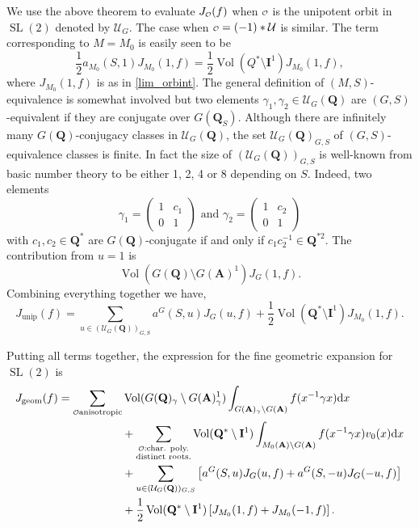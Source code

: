 \documentclass[11pt]{amsart}
\def\A{\mathbf A}
\def\I{\mathbf I}
\def\Q{\mathbf Q}
\def\o{\scalebox{0.8}{$\scriptstyle\mathcal{O}$}}
\def\UUU{\mathcal U}
\def\d{\text d}
\def\bs{\setminus}
\def\sl{\operatorname{SL}}
\def\vol{\operatorname{Vol}}
\theoremstyle{remark}
\begin{document}
We use the above theorem to evaluate $J_{\o}(f)$ when $\o$ is the unipotent orbit in $\sl(2)$ denoted by $\UUU_G$. The case when $\o = (-1)*\UUU$ is similar. The term corresponding to $M=M_0$ is easily seen to be 
\[ \frac{1}{2} a_{M_0}(S, 1) J_{M_0}(1, f) = \frac{1}{2} \vol(Q^*\bs \I^1) J_{M_0}(1, f), \]
where $J_{M_0}(1, f)$ is as in \cref{lim_orbint}. The general definition of $(M, S)$-equivalence is somewhat involved but two elements $\gamma_1, \gamma_2 \in \UUU_G(\Q)$ are $(G, S)$-equivalent if they are conjugate over $G(\Q_S)$. Although there are infinitely many $G(\Q)$-conjugacy classes in $\UUU_G(\Q)$, the set $\UUU_G(\Q)_{G, S}$ of $(G, S)$-equivalence classes is finite. In fact the size of $(\UUU_G(\Q))_{G, S}$ is well-known from basic number theory to be either 1, 2, 4 or 8 depending on $S$. Indeed, two elements
\[ \gamma_1 = \begin{pmatrix} 1 & c_1 \\ 0 & 1 \end{pmatrix} \text{ and } \gamma_2 = \begin{pmatrix} 1 & c_2 \\ 0 & 1 \end{pmatrix}
\]
with $c_1, c_2 \in \Q^*$ are $G(\Q)$-conjugate if and only if $c_1 c_2^{-1} \in \Q^{*2}$. The contribution from $u=1$ is 
\[ \vol(G(\Q)\bs G(\A)^1) J_G(1, f). \]
Combining everything together we have, 
\[ J_{\text{unip}}(f) = \sum_{u \in (\UUU_G(\Q))_{G, S}} a^G(S, u) J_G(u, f) + \frac{1}{2} \vol(\Q^*\bs \I^1) J_{M_0}(1, f). \]

Putting all terms together, the expression for the fine geometric expansion for $\sl(2)$ is
\begin{equation} \label{eq:fine_geom}
	\begin{aligned}
		J_{\text{geom}}(f) = \sum_{\o \text{anisotropic}} & \vol(G(\Q)_\gamma \bs G(\A)^1_\gamma) 
					\int_{G(\A)_\gamma \bs G(\A)} f(x^{-1} \gamma x) \d x \\
			& + \sum_{\substack{\o : \text{char. poly.} \\ \text{distinct roots.}}} \vol(\Q^*\bs \I^1) 
					\int_{M_0(\A)\bs G(\A)} f(x^{-1}\gamma x) v_0(x) \d x \\
			& + \sum_{u \in (\UUU_G(\Q))_{G, S}} \left[ a^G(S, u) J_G(u, f) + a^G(S, -u) J_G(-u, f) 
					\right] \\
			& + \frac{1}{2} \vol(\Q^*\bs \I^1) \left[ J_{M_0}(1, f) + J_{M_0}(-1, f) 
					\right]. 
	\end{aligned}
\end{equation}
\end{document}

